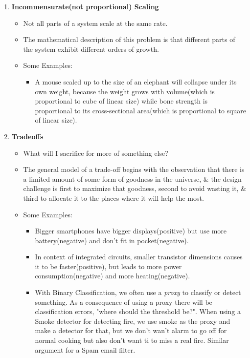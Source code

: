 \documentclass{article}
\begin{document}
\begin{enumerate}
\begin{itemize}
    \end{itemize}
    \item \textbf{Incommensurate(not proportional) Scaling}
    \begin{itemize}
        \item Not all parts of a system scale at the same rate.
        \item The mathematical description of this problem is that different parts of the system exhibit different orders of growth.
        \item[] Some Examples:
        \begin{itemize}
            \item A mouse scaled up to the size of an elephant will collapse under its own weight, because the weight grows with volume(which is proportional to cube of linear size) while bone strength is proportional to its cross-sectional area(which is proportional to square of linear size).
        \end{itemize}
    \end{itemize}

    \item \textbf{Tradeoffs}
    \begin{itemize}
        \item What will I sacrifice for more of something else?
        \item The general model of a trade-off begins with the observation that there is a limited amount of some form of goodness in the universe, \& the design challenge is first to maximize that goodness, second to avoid wasting it, \& third to allocate it to the places where it will help the most.
        \item[] Some Examples:
        \begin{itemize}
            \item Bigger smartphones have bigger displays(positive) but use more battery(negative) and don't fit in pocket(negative).
            \item In context of integrated circuits, smaller transistor dimensions causes it to be faster(positive), but leads to more power consumption(negative) and more heating(negative).
            \item With Binary Classification, we often use a \textit{proxy} to classify or detect something. As a consequence of using a proxy there will be classification errors, "where should the threshold be?". When using a Smoke detector for detecting fire, we use smoke as the proxy and make a detector for that, but we don't wan't alarm to go off for normal cooking but also don't want ti to miss a real fire. Similar argument for a Spam email filter.
        \end{itemize}
    \end{itemize}
\end{enumerate}
\end{document}
